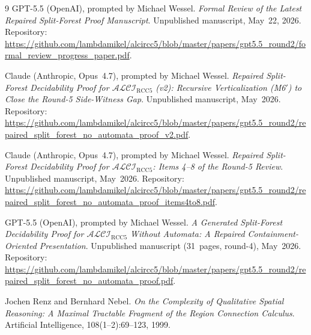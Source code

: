 \documentclass[11pt]{article}
\newcommand{\Logic}{\mathcal{ALCI}_{\mathrm{RCC5}}}
\begin{document}
\begin{thebibliography}{9}
GPT-5.5 (OpenAI), prompted by Michael Wessel.
\emph{Formal Review of the Latest Repaired Split-Forest Proof
Manuscript}.  Unpublished manuscript, May~22, 2026.  Repository:
\url{https://github.com/lambdamikel/alcircc5/blob/master/papers/gpt5.5_round2/formal_review_progress_paper.pdf}.

Claude (Anthropic, Opus~4.7), prompted by Michael Wessel.
\emph{Repaired Split-Forest Decidability Proof for $\Logic$ (v2):
Recursive Verticalization (M6$'$) to Close the Round-5
Side-Witness Gap}.  Unpublished manuscript, May~2026.  Repository:
\url{https://github.com/lambdamikel/alcircc5/blob/master/papers/gpt5.5_round2/repaired_split_forest_no_automata_proof_v2.pdf}.

Claude (Anthropic, Opus~4.7), prompted by Michael Wessel.
\emph{Repaired Split-Forest Decidability Proof for $\Logic$: Items
4--8 of the Round-5 Review}.  Unpublished manuscript, May~2026.
Repository:
\url{https://github.com/lambdamikel/alcircc5/blob/master/papers/gpt5.5_round2/repaired_split_forest_no_automata_proof_items4to8.pdf}.

GPT-5.5 (OpenAI), prompted by Michael Wessel.
\emph{A Generated Split-Forest Decidability Proof for $\Logic$
Without Automata: A Repaired Containment-Oriented Presentation}.
Unpublished manuscript (31~pages, round-4), May~2026.  Repository:
\url{https://github.com/lambdamikel/alcircc5/blob/master/papers/gpt5.5_round2/repaired_split_forest_no_automata_proof.pdf}.

Jochen Renz and Bernhard Nebel.
\emph{On the Complexity of Qualitative Spatial Reasoning: A
Maximal Tractable Fragment of the Region Connection Calculus}.
Artificial Intelligence, 108(1--2):69--123, 1999.
\end{thebibliography}
\end{document}
